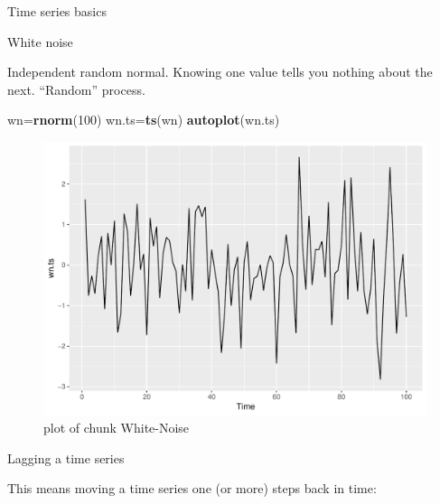\documentclass[ignorenonframetext,]{beamer}
\newenvironment{Shaded}{\begin{snugshade}}{\end{snugshade}}
\newcommand{\DataTypeTok}[1]{\textcolor[rgb]{0.13,0.29,0.53}{#1}}
\newcommand{\DecValTok}[1]{\textcolor[rgb]{0.00,0.00,0.81}{#1}}
\newcommand{\KeywordTok}[1]{\textcolor[rgb]{0.13,0.29,0.53}{\textbf{#1}}}
\newcommand{\NormalTok}[1]{#1}
\newcommand{\OperatorTok}[1]{\textcolor[rgb]{0.81,0.36,0.00}{\textbf{#1}}}
\newcommand{\StringTok}[1]{\textcolor[rgb]{0.31,0.60,0.02}{#1}}
\begin{document}
\begin{frame}[fragile]{Time series basics}
\protect\hypertarget{time-series-basics}{}

\begin{block}{White noise}

Independent random normal. Knowing one value tells you nothing about the
next. ``Random'' process.

\begin{Shaded}
\begin{Highlighting}[]
\NormalTok{wn=}\KeywordTok{rnorm}\NormalTok{(}\DecValTok{100}\NormalTok{)}
\NormalTok{wn.ts=}\KeywordTok{ts}\NormalTok{(wn)}
\KeywordTok{autoplot}\NormalTok{(wn.ts)}
\end{Highlighting}
\end{Shaded}

\begin{figure}
\centering
\includegraphics{figure/White-Noise-1.pdf}
\caption{plot of chunk White-Noise}
\end{figure}

\end{block}

\begin{block}{Lagging a time series}

This means moving a time series one (or more) steps back in time:

\begin{Shaded}
\end{Shaded}


\end{block}
\end{frame}
\end{document}
